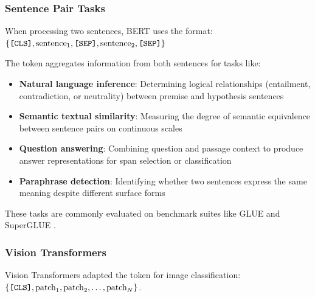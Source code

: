 \subsubsection{Sentence Pair Tasks}
When processing two sentences, BERT uses the format:
$\{\texttt{[CLS]}{}, \text{sentence}_1, \texttt{[SEP]}{}, \text{sentence}_2, \texttt{[SEP]}{}\}$

The \cls{} token aggregates information from both sentences for tasks like:
\begin{itemize}
\item \textbf{Natural language inference}: Determining logical relationships (entailment, contradiction, or neutrality) between premise and hypothesis sentences
\item \textbf{Semantic textual similarity}: Measuring the degree of semantic equivalence between sentence pairs on continuous scales
\item \textbf{Question answering}: Combining question and passage context to produce answer representations for span selection or classification
\item \textbf{Paraphrase detection}: Identifying whether two sentences express the same meaning despite different surface forms
\end{itemize}

These tasks are commonly evaluated on benchmark suites like GLUE \citep{wang2018glue} and SuperGLUE \citep{wang2019superglue}.

\subsubsection{Vision Transformers}
Vision Transformers \citep{dosovitskiy2020image} adapted the \cls{} token for image classification:\\
$\{\texttt{[CLS]}{}, \text{patch}_1, \text{patch}_2, \ldots, \text{patch}_N\}$.


